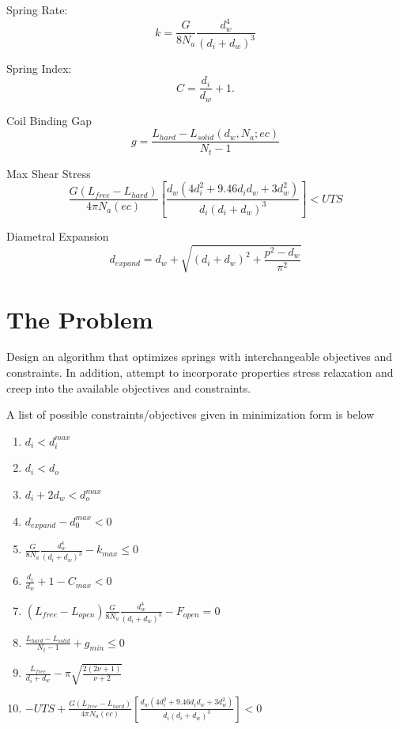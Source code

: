 \documentclass[10pt]{article}
\begin{document}
			Spring Rate:\begin{equation} k = \frac{G}{8N_{a}}\frac{d_{w}^{4}}{(d_{i} + d_{w})^{3}}\end{equation}
				
				 Spring Index:\begin{equation}C = \frac{d_{i}}{d_{w}} + 1.\end{equation}
				
				Coil Binding Gap\begin{equation} g = \frac{L_{hard} - L_{solid}(d_{w},N_{a}; ec)}{N_{t} - 1}\end{equation}
		
				 Max Shear Stress\begin{equation} \frac{G(L_{free} - L_{hard})}{4 \pi N_{a} (ec)} \left[\frac{d_{w} (4d_{i}^{2} + 9.46d_{i} 
d_{w} + 3 d_{w}^{2})}{d_{i}(d_{i}+d_{w})^{3}}\right]< UTS\end{equation}
		
				Diametral Expansion\begin{equation} d_{expand} = d_{w} + \sqrt{(d_{i} + d_{w})^{2} + \frac{p^{2} - d_{w}}{\pi^{2}}}
			\end{equation}
			
\section{The Problem} 
\label{sec:Problem}

Design an algorithm that optimizes springs with interchangeable objectives and constraints. In addition, attempt to incorporate properties stress relaxation and creep into the available objectives and constraints. 

A list of possible constraints/objectives given in minimization form is below

\begin{enumerate}
\item $d_{i} < d_{i}^{max}$
\item $d_{i} < d_{o}$
\item $d_{i} + 2d_{w} < d_{o}^{max}$
\item$d_{expand} - d_{0}^{max} < 0 $
\item$ \frac{G}{8N_{a}}\frac{d_{w}^{4}}{(d_{i} + d_{w})^{3}} - k_{max} \le 0 $
\item $\frac{d_{i}}{d_{w}} + 1 - C_{max}< 0$
\item $(L_{free} - L_{open})\frac{G}{8N_{a}}\frac{d_{w}^{4}}{(d_{i} + d_{w})^{3}} - F_{open} = 0 $
\item $\frac{L_{hard} - L_{solid}}{N_{t} - 1} + g_{min} \le  0$
\item$\frac{L_{free}}{d_{i} + d_{w}} - \pi \sqrt{\frac{2(2 \nu + 1)}{\nu + 2}}$
\item$-UTS + \frac{G(L_{free} - L_{hard})}{4 \pi N_{a} (ec)} \left[\frac{d_{w} (4d_{i}^{2} + 9.46d_{i} 
d_{w} + 3 d_{w}^{2})}{d_{i}(d_{i}+d_{w})^{3}}\right] < 0$
\end{enumerate}	
\end{document}
